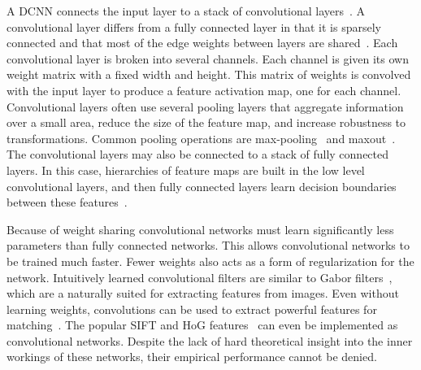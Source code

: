     A DCNN connects the input layer to a stack of convolutional layers~\cite{krizhevsky_imagenet_2012}.
    A convolutional layer differs from a fully connected layer in that it is sparsely connected and that most of the
    edge weights between layers are shared~\cite{lecun_gradient_based_1998, fukushima_neocognitron_1988,
    serre_robust_2007}. Each convolutional layer is broken into several channels. Each channel is given its own weight
    matrix with a fixed width and height. This matrix of weights is convolved with the input layer to produce a feature
    activation map, one for each channel. Convolutional layers often use several pooling layers that aggregate
    information over a small area, reduce the size of the feature map, and increase robustness to transformations.
    Common pooling operations are max-pooling~\cite{serre_robust_2007, krizhevsky_imagenet_2012} and
    maxout~\cite{goodfellow_maxout_2013}.
    The convolutional layers may also be connected to a stack of fully connected layers. In this case, hierarchies of
    feature maps are built in the low level convolutional layers, and then fully connected layers learn decision
    boundaries between these features~\cite{zeiler_visualizing_2014}.

    Because of weight sharing convolutional networks must learn significantly less parameters than fully connected
    networks. This allows convolutional networks to be trained much faster. Fewer weights also acts as a form of
    regularization for the network. Intuitively learned convolutional filters are similar to Gabor
    filters~\cite{gabor_theory_1946}, which are a naturally suited for extracting features from images. Even without
    learning weights, convolutions can be used to extract powerful features for matching~\cite{revaud_deep_2015}. The
    popular SIFT and HoG features~\cite{mahendran_understanding_2014} can even be implemented as convolutional networks.
    Despite the lack of hard theoretical insight into the inner workings of these networks, their empirical performance
    cannot be denied.

